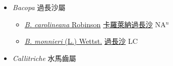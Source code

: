 
  \begin{itemize}
 \item[] \textit{Bacopa} 過長沙屬
                    
  \begin{itemize}
        \item[] \href{http://www.theplantlist.org/tpl1.1/search?q=Bacopa+carolineana}{\textit{B. carolineana} Robinson}   \href{\detokenize{http://taibnet.sinica.edu.tw/chi/taibnet_species_list.php?T2=卡羅萊納過長沙&T2_new_value=true&fr=y}}{卡羅萊納過長沙} NA$^n$
        \item[] \href{http://www.theplantlist.org/tpl1.1/search?q=Bacopa+monnieri}{\textit{B. monnieri} (L.) Wettst.}   \href{\detokenize{http://taibnet.sinica.edu.tw/chi/taibnet_species_list.php?T2=過長沙&T2_new_value=true&fr=y}}{過長沙} LC
  \end{itemize}
 \item[] \textit{Callitriche} 水馬齒屬
                    

\end{itemize}
